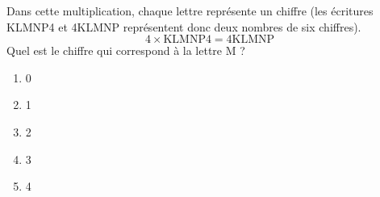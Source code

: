 Dans cette multiplication, chaque lettre représente un chiffre (les écritures KLMNP4 et 4KLMNP représentent donc deux nombres de six chiffres).
\[4\times\mbox{KLMNP4}=\mbox{4KLMNP}\]
Quel est le chiffre qui correspond à la lettre M ?
\begin{multicols}{5}
  \begin{enumerate}[A/]
  \item 0
  \item 1
  \item 2
  \item 3
  \item 4
  \end{enumerate}
\end{multicols}